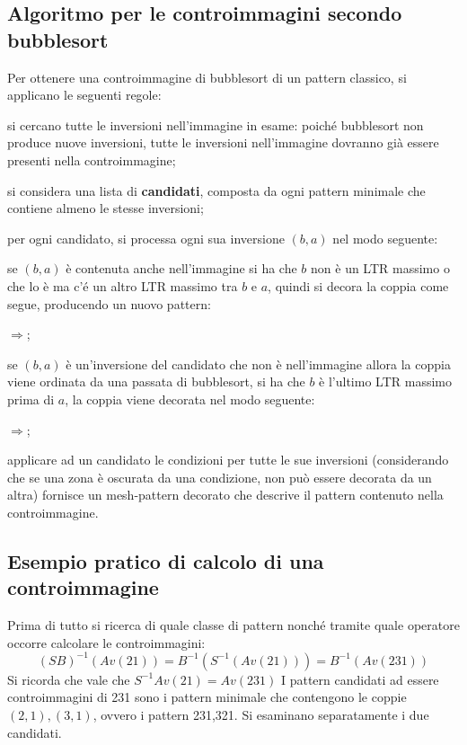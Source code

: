 \subsection*{Algoritmo per le controimmagini secondo bubblesort}
Per ottenere una controimmagine di bubblesort di un pattern classico, si applicano le seguenti regole:
\begin{description}
	\item si cercano tutte le inversioni nell'immagine in esame: poich\'e bubblesort non produce nuove inversioni, tutte le inversioni nell'immagine dovranno gi\`a essere presenti nella controimmagine;
	\item si considera una lista di \textbf{candidati}, composta da ogni pattern minimale che contiene almeno le stesse inversioni;
	\item per ogni candidato, si processa ogni sua inversione $(b,a)$ nel modo seguente:
	\begin{description}
	\item se $(b,a)$ \`e contenuta anche nell'immagine si ha che $b$ non \`e un LTR massimo o che lo \`e ma c'\'e un altro LTR massimo tra $b$ e $a$, quindi si decora la coppia come segue, producendo un nuovo pattern:
	\begin{center}
		$\Rightarrow$;
	\end{center}
	\item se $(b,a)$ \`e un'inversione del candidato che non \`e nell'immagine allora la coppia viene ordinata da una passata di bubblesort, si ha che $b$ \`e l'ultimo LTR massimo prima di $a$, la coppia viene decorata nel modo seguente:
	\begin{center}
		$\Rightarrow$;\\
	\end{center}
	\end{description}
	\item applicare ad un candidato le condizioni per tutte le sue inversioni (considerando che se una zona \`e oscurata da una condizione, non pu\`o essere decorata da un altra) fornisce un mesh-pattern decorato che descrive il pattern contenuto nella controimmagine.
\end{description}
\subsection*{Esempio pratico di calcolo di una controimmagine}
Prima di tutto si ricerca di quale classe di pattern nonch\'e tramite quale operatore occorre calcolare le controimmagini:
$$(SB)^{-1}(Av(21)) = B^{-1}(S^{-1}(Av(21)))=B^{-1}(Av(231))$$
Si ricorda che vale che $S^{-1}Av(21) = Av(231)$
I pattern candidati ad essere controimmagini di 231 sono i pattern minimale che contengono le coppie $(2,1),(3,1)$, ovvero i pattern 231,321. Si esaminano separatamente i due candidati.
